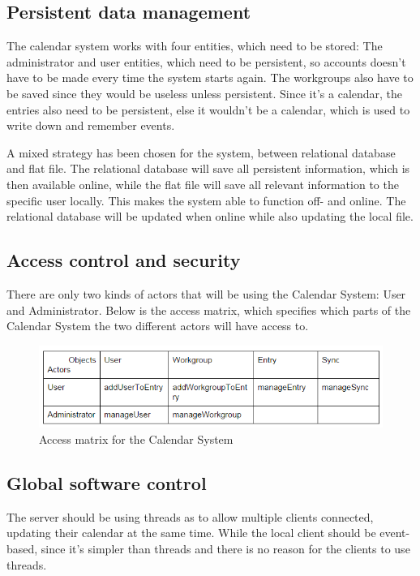 \subsection{Persistent data management}

The calendar system works with four entities, which need to be stored: The administrator and user entities, which need to be persistent, so accounts  doesn’t have to be made every time the system starts again. The workgroups also have to be saved since they would be useless unless persistent.
	Since it’s a calendar, the entries also need to be persistent, else it wouldn’t be a calendar, which is used to write down and remember events.

A mixed strategy has been chosen for the system, between relational database and flat file. The relational database will save all persistent information, which is then available online, while the flat file will save all relevant information to the specific user locally.
	This makes the system able to function off- and online. The relational database will be updated when online while also updating the local file.
\subsection{Access control and security}
There are only two kinds of actors that will be using the Calendar System: User and Administrator. Below is the access matrix, which specifies which parts of the Calendar System the two different actors will have access to.

\begin{figure}[h]
\centering
\includegraphics[scale = 0.8]{accessControl}
\caption{Access matrix for the Calendar System}
\end{figure}

\subsection{Global software control}
The server should be using threads as to allow multiple clients connected, updating their calendar at the same time. While the local client should be event-based, since it’s simpler than threads and there is no reason for the clients to use threads.

